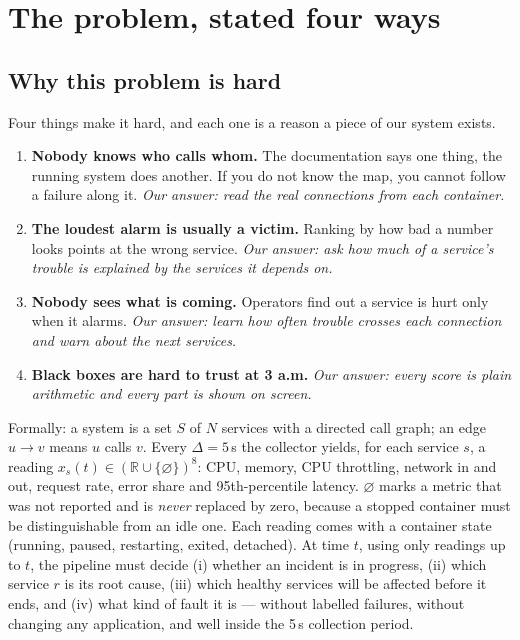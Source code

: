 \chapter{The problem, stated four ways}
\label{ch:problem}

\section{Why this problem is hard}
\begin{simplebox}
Four things make it hard, and each one is a reason a piece of our system exists.

\begin{enumerate}
\item \textbf{Nobody knows who calls whom.} The documentation says one thing, the running system does another. If you do not know the map, you cannot follow a failure along it. \emph{Our answer: read the real connections from each container.}
\item \textbf{The loudest alarm is usually a victim.} Ranking by how bad a number looks points at the wrong service. \emph{Our answer: ask how much of a service's trouble is explained by the services it depends on.}
\item \textbf{Nobody sees what is coming.} Operators find out a service is hurt only when it alarms. \emph{Our answer: learn how often trouble crosses each connection and warn about the next services.}
\item \textbf{Black boxes are hard to trust at 3 a.m.} \emph{Our answer: every score is plain arithmetic and every part is shown on screen.}
\end{enumerate}
\end{simplebox}

\begin{techbox}
Formally: a system is a set $S$ of $N$ services with a directed call graph; an edge $u\to v$ means $u$ calls $v$. Every $\Delta=5$\,s the collector yields, for each service $s$, a reading $x_s(t)\in(\mathbb R\cup\{\varnothing\})^8$: CPU, memory, CPU throttling, network in and out, request rate, error share and 95th-percentile latency. $\varnothing$ marks a metric that was not reported and is \emph{never} replaced by zero, because a stopped container must be distinguishable from an idle one. Each reading comes with a container state (running, paused, restarting, exited, detached). At time $t$, using only readings up to $t$, the pipeline must decide (i) whether an incident is in progress, (ii) which service $r$ is its root cause, (iii) which healthy services will be affected before it ends, and (iv) what kind of fault it is --- without labelled failures, without changing any application, and well inside the 5\,s collection period.
\end{techbox}

